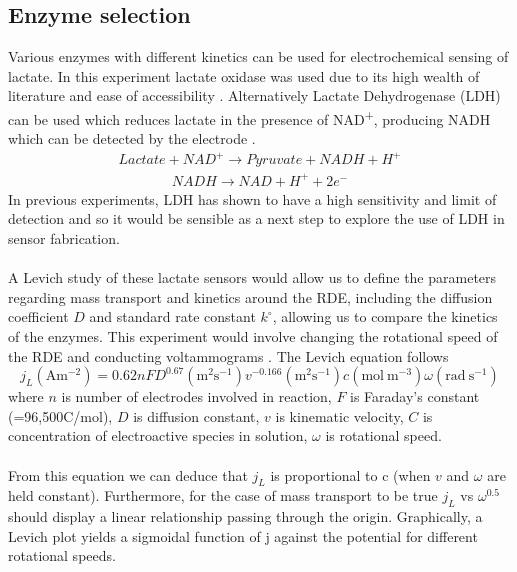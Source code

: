 \begin{appendices}
\subsection{Enzyme selection}
Various enzymes with different kinetics can be used for electrochemical sensing of lactate. In this experiment lactate oxidase was used due to its high wealth of literature and ease of accessibility \cite{romero2010amperometric}. Alternatively Lactate Dehydrogenase (LDH) can be used which reduces lactate in the presence of NAD\textsuperscript{+}, producing NADH which can be detected by the electrode \cite{narayanan2020lactic}.
\begin{align}
    Lactate + NAD^{+} \xrightarrow{} Pyruvate + NADH + H^{+}
\end{align}
\begin{align}
    NADH \xrightarrow{} NAD + H^{+} + 2e^{-}
\end{align}
In previous experiments, LDH has shown to have a high sensitivity and limit of detection and so it would be sensible as a next step to explore the use of LDH in sensor fabrication. \\\\
A Levich study of these lactate sensors would allow us to define the parameters regarding mass transport and kinetics around the RDE, including the diffusion coefficient $D$ and standard rate constant $k^{\circ}$, allowing us to compare the kinetics of the enzymes. This experiment would involve changing the rotational speed of the RDE and conducting voltammograms \cite{treimer2002consideration}.  The Levich equation follows
\begin{equation}
    j_{L} \mathrm{(Am^{-2})} = 0.62nFD^{0.67}\mathrm{(m^{2}s^{-1})} v^{-0.166}\mathrm{(m^{2}s^{-1})}c\mathrm{(mol\ m^{-3})}\omega\mathrm{(rad \ s^{-1})}
\end{equation}
where $n$ is number of electrodes involved in reaction, $F$ is Faraday’s constant (=96,500C/mol), $D$ is diffusion constant, $v$ is kinematic velocity, $C$ is concentration of electroactive species in solution, $\omega$ is rotational speed.\\\\
From this equation we can deduce that $j_{L}$ is proportional to c (when $v$ and $\omega$ are held constant). Furthermore, for the case of mass transport to be true $j_{L}$ vs $\omega^{0.5}$ should display a linear relationship passing through the origin.
Graphically, a Levich plot yields a sigmoidal function of j against the potential for different rotational speeds. \\\\

\end{appendices}
